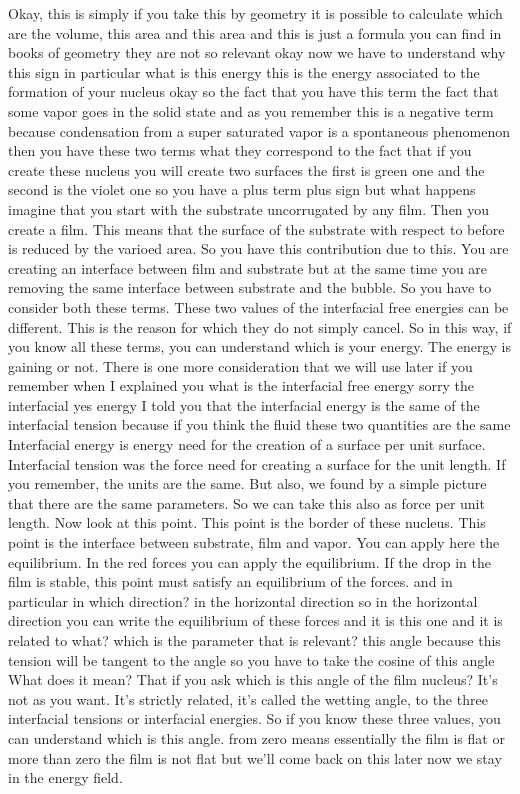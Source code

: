 Okay, this is simply if you take this by geometry it is possible to calculate which are the volume, this area and this area and this is just a formula you can find in books of geometry they are not so relevant okay now we have to understand why this sign in particular what is this energy this is the energy associated to the formation of your nucleus okay so the fact that you have this term the fact that some vapor goes in the solid state and as you remember this is a negative term because condensation from a super saturated vapor is a spontaneous phenomenon then you have these two terms what they correspond to the fact that if you create these nucleus you will create two surfaces the first is green one and the second is the violet one so you have a plus term plus sign but what happens imagine that you start with the substrate uncorrugated by any film. Then you create a film. This means that the surface of the substrate with respect to before is reduced by the varioed area. So you have this contribution due to this. You are creating an interface between film and substrate but at the same time you are removing the same interface between substrate and the bubble. So you have to consider both these terms. These two values of the interfacial free energies can be different. This is the reason for which they do not simply cancel. So in this way, if you know all these terms, you can understand which is your energy. The energy is gaining or not. There is one more consideration that we will use later if you remember when I explained you what is the interfacial free energy sorry the interfacial yes energy I told you that the interfacial energy is the same of the interfacial tension because if you think the fluid these two quantities are the same Interfacial energy is energy need for the creation of a surface per unit surface. Interfacial tension was the force need for creating a surface for the unit length. If you remember, the units are the same. But also, we found by a simple picture that there are the same parameters. So we can take this also as force per unit length. Now look at this point. This point is the border of these nucleus. This point is the interface between substrate, film and vapor. You can apply here the equilibrium. In the red forces you can apply the equilibrium. If the drop in the film is stable, this point must satisfy an equilibrium of the forces. and in particular in which direction? in the horizontal direction so in the horizontal direction you can write the equilibrium of these forces and it is this one and it is related to what? which is the parameter that is relevant? this angle because this tension will be tangent to the angle so you have to take the cosine of this angle What does it mean? That if you ask which is this angle of the film nucleus? It's not as you want. It's strictly related, it's called the wetting angle, to the three interfacial tensions or interfacial energies. So if you know these three values, you can understand which is this angle. from zero means essentially the film is flat or more than zero the film is not flat but we'll come back on this later now we stay in the energy field.
